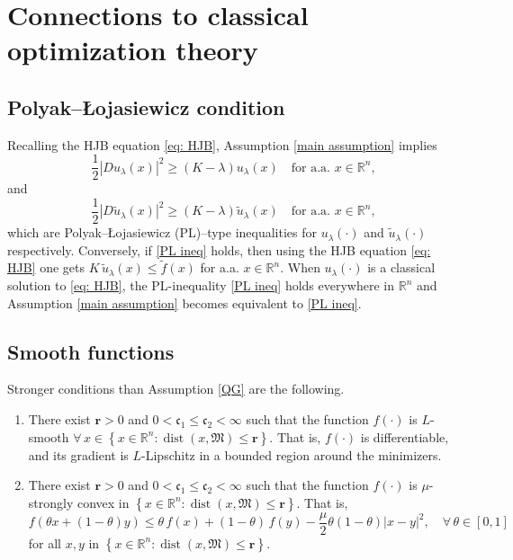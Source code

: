 \documentclass[12pt]{amsart}
\numberwithin{equation}{section}
\theoremstyle{plain}
\begin{document}
\section{Connections to classical optimization theory}\label{sec: comparison}


\subsection{Polyak--{\L}ojasiewicz condition}\label{sec: PL}

Recalling the HJB equation \eqref{eq: HJB}, 
Assumption \ref{main assumption} implies 
\begin{equation}\label{PL ineq}
\frac{1}{2}\left|D u_\lambda(x)\right|^2 \geq(K-\lambda) u_\lambda(x) \quad \text{for a.a. } x\in\mathbb{R}^{n},
\end{equation}
and 
\begin{equation*}
\frac{1}{2}\left|D \tilde{u}_\lambda(x)\right|^2 \geq(K-\lambda) \tilde{u}_\lambda(x) \quad \text{for a.a. } x\in\mathbb{R}^{n},
\end{equation*}
which are  Polyak–\L ojasiewicz (PL)–type inequalities for $u_\lambda(\cdot)$ and $\tilde{u}_{\lambda}(\cdot)$ respectively. Conversely, if \eqref{PL ineq} holds, then using the HJB equation \eqref{eq: HJB} one gets $K \,\tilde{u}_{\lambda}(x) \leq \tilde{f}(x)$ for a.a. $x\in\mathbb{R}^{n}$. When $u_{\lambda}(\cdot)$ is a classical solution to \eqref{eq: HJB}, the PL-inequality \eqref{PL ineq} holds everywhere in $\mathbb{R}^{n}$ and Assumption \ref{main assumption} becomes equivalent to \eqref{PL ineq}.


\subsection{Smooth functions}

Stronger conditions than Assumption \ref{QG} are the following.  

\begin{enumerate}[label=\textbf{(G\arabic*)}]
    \item\label{L smooth} There exist $\mathbf{r}>0$  and $0<\mathfrak{c}_{1}\leq \mathfrak{c}_{2}<\infty$  such that the function $f(\cdot)$ is $L$-smooth $\forall\,x \in \left\{x\in\mathbb{R}^{n}: \operatorname{dist}(x,\mathfrak{M})\leq \mathbf{r}\right\}$. 
    That is, $f(\cdot)$ is differentiable, and its gradient is $L$-Lipschitz in a bounded region around the minimizers. 
    \item\label{mu conv} There exist $\mathbf{r}>0$  and $0<\mathfrak{c}_{1}\leq \mathfrak{c}_{2}<\infty$  such that the function $f(\cdot)$ is $\mu$-strongly convex in $\left\{x\in\mathbb{R}^{n}: \operatorname{dist}(x,\mathfrak{M})\leq \mathbf{r}\right\}$. 
    That is, 
    \begin{equation*}
        f(\theta x + (1-\theta)y) \leq \theta\,f(x) + (1-\theta)\,f(y) - \frac{\mu}{2}\theta(1-\theta)|x-y|^{2}, \quad \forall\,\theta\in[0,1]
    \end{equation*}
    for all $x,y$ in $\left\{x\in\mathbb{R}^{n}: \operatorname{dist}(x,\mathfrak{M})\leq \mathbf{r}\right\}$. 
\end{enumerate}
\end{document}
